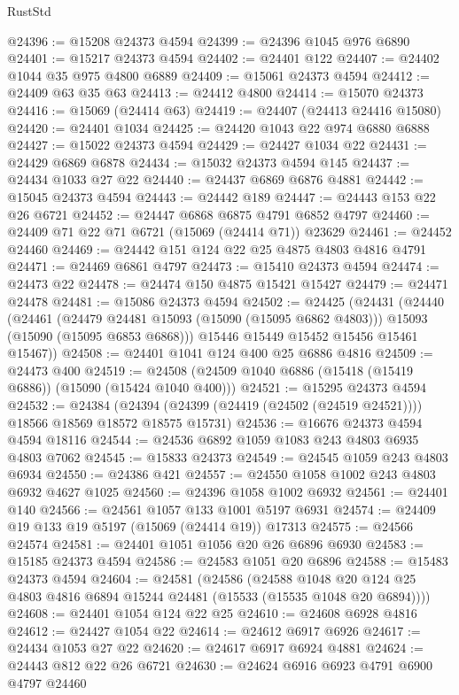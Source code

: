\begin{lexlean}{RustStd}
\begin{coremodule}
@24396 := @15208 @24373 @4594
@24399 := @24396 @1045 @976 @6890
@24401 := @15217 @24373 @4594
@24402 := @24401 @122
@24407 := @24402 @1044 @35 @975 @4800 @6889
@24409 := @15061 @24373 @4594
@24412 := @24409 @63 @35 @63
@24413 := @24412 @4800
@24414 := @15070 @24373
@24416 := @15069 (@24414 @63)
@24419 := @24407 (@24413 @24416 @15080)
@24420 := @24401 @1034
@24425 := @24420 @1043 @22 @974 @6880 @6888
@24427 := @15022 @24373 @4594
@24429 := @24427 @1034 @22
@24431 := @24429 @6869 @6878
@24434 := @15032 @24373 @4594 @145
@24437 := @24434 @1033 @27 @22
@24440 := @24437 @6869 @6876 @4881
@24442 := @15045 @24373 @4594
@24443 := @24442 @189
@24447 := @24443 @153 @22 @26 @6721
@24452 := @24447 @6868 @6875 @4791 @6852 @4797
@24460 := @24409 @71 @22 @71 @6721 (@15069 (@24414 @71)) @23629
@24461 := @24452 @24460
@24469 := @24442 @151 @124 @22 @25 @4875 @4803 @4816 @4791
@24471 := @24469 @6861 @4797
@24473 := @15410 @24373 @4594
@24474 := @24473 @22
@24478 := @24474 @150 @4875 @15421 @15427
@24479 := @24471 @24478
@24481 := @15086 @24373 @4594
@24502 := @24425
    (@24431
      (@24440
        (@24461
          (@24479 @24481 @15093 (@15090 (@15095 @6862 @4803)))
          @15093
          (@15090 (@15095 @6853 @6868)))
        @15446
        @15449
        @15452
        @15456
        @15461
        @15467))
@24508 := @24401 @1041 @124 @400 @25 @6886 @4816
@24509 := @24473 @400
@24519 := @24508 (@24509 @1040 @6886 (@15418 (@15419 @6886)) (@15090 (@15424 @1040 @400)))
@24521 := @15295 @24373 @4594
@24532 := @24384
    (@24394 (@24399 (@24419 (@24502 (@24519 @24521)))) @18566 @18569 @18572 @18575 @15731)
@24536 := @16676 @24373 @4594 @4594 @18116
@24544 := @24536 @6892 @1059 @1083 @243 @4803 @6935 @4803 @7062
@24545 := @15833 @24373
@24549 := @24545 @1059 @243 @4803 @6934
@24550 := @24386 @421
@24557 := @24550 @1058 @1002 @243 @4803 @6932 @4627 @1025
@24560 := @24396 @1058 @1002 @6932
@24561 := @24401 @140
@24566 := @24561 @1057 @133 @1001 @5197 @6931
@24574 := @24409 @19 @133 @19 @5197 (@15069 (@24414 @19)) @17313
@24575 := @24566 @24574
@24581 := @24401 @1051 @1056 @20 @26 @6896 @6930
@24583 := @15185 @24373 @4594
@24586 := @24583 @1051 @20 @6896
@24588 := @15483 @24373 @4594
@24604 := @24581
    (@24586
      (@24588 @1048 @20 @124 @25 @4803 @4816 @6894 @15244 @24481 (@15533 (@15535 @1048 @20 @6894))))
@24608 := @24401 @1054 @124 @22 @25
@24610 := @24608 @6928 @4816
@24612 := @24427 @1054 @22
@24614 := @24612 @6917 @6926
@24617 := @24434 @1053 @27 @22
@24620 := @24617 @6917 @6924 @4881
@24624 := @24443 @812 @22 @26 @6721
@24630 := @24624 @6916 @6923 @4791 @6900 @4797 @24460

\end{coremodule}
\end{lexlean}
